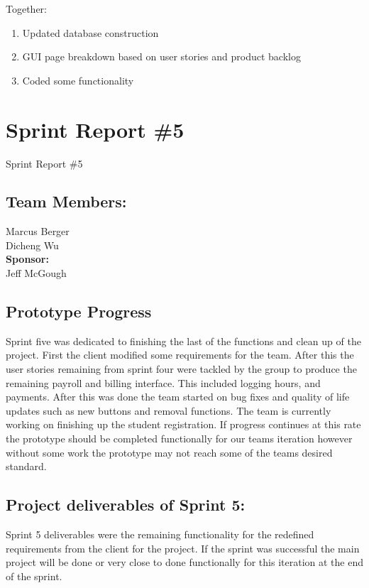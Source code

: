 Together:
\begin{enumerate}
\item Updated database construction
\item GUI page breakdown based on user stories and product backlog
\item Coded some functionality
\end{enumerate}

\section{Sprint Report \#5}

Sprint Report \#5


\subsection{Team Members:}
Marcus Berger
\\Dicheng Wu\\
\textbf{Sponsor:}
\\Jeff McGough
\\

\subsection{Prototype Progress}


Sprint five was dedicated to finishing the last of the functions and clean up of the project. First the client modified  some requirements for the team. After this the user stories remaining from sprint four were tackled by the group to produce the remaining payroll and billing interface. This included logging hours, and payments. After this was done the team started on bug fixes and quality of life updates such as new buttons and removal functions. The team is currently working on finishing up the student registration. If progress continues at this rate the prototype should be completed functionally for our teams iteration however without some work the prototype may not reach some of the teams desired standard.


\subsection{Project deliverables of Sprint 5:}

Sprint 5 deliverables were the remaining functionality for the redefined requirements from the client for the project. If the sprint was successful the main project will be done or very close to done functionally for this iteration at the end of the sprint.


